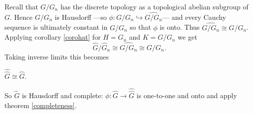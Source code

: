 Recall that $G/G_n$ has the discrete topology as a topological abelian subgroup of $G$. Hence $G/G_n$ is Hausdorff ---so $\phi\colon G/G_n \hookrightarrow \widehat{G/G_n}$--- and every Cauchy sequence is ultimately constant in $G/G_n$ so that $\phi$ is onto. Thus $\widehat{G/G_n}\cong G/G_n$. Applying corollary \ref{corohat} for $H=G_n$ and $K=G/G_n$ we get
\[
\hat G/\hat G_n\cong\widehat{G/G_n}\cong G/G_n.
\]
Taking inverse limits this becomes
\begin{coro}
    $\hat{\hat{G}}\cong \hat G$.
\end{coro}

So $\hat G$ is Hausdorff and complete: $\phi\colon \hat G\to \hat{\hat {G}}$ is one-to-one and onto and apply theorem \ref{completeness}.


